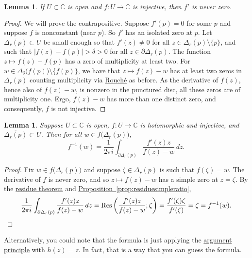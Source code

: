 \documentclass[12pt,openany]{book}
\newcommand{\sabs}[1]{\lvert {#1} \rvert}
\newcommand{\C}{{\mathbb{C}}}
\theoremstyle{plain}
\newtheorem{lemma}[thm]{Lemma}
\theoremstyle{remark}
\theoremstyle{definition}
\theoremstyle{exercise}
\theoremstyle{example}
\newcommand{\propref}[1]{\hyperref[#1]{Proposition~\ref*{#1}}}
\begin{document}
\begin{lemma} \label{lemma:dernonzero}
If $U \subset \C$ is open and $f \colon U \to \C$ is injective, then
$f'$ is never zero.
\end{lemma}

\begin{proof}
We will prove the contrapositive.
Suppose $f'(p) = 0$ for some $p$
and suppose $f$ is nonconstant (near $p$).
So $f'$ has
an isolated zero at $p$.
Let $\overline{\Delta_r(p)} \subset U$
be small enough so that $f'(z) \not= 0$ for all $z \in \Delta_r(p) \setminus \{ p \}$,
and such that $\sabs{f(z)-f(p)} > \delta > 0$ for all $z \in \partial
\Delta_r(p)$.
The function $z \mapsto f(z) - f(p)$ has a zero of multiplicity at least
two.
For $w \in \Delta_{\delta}\bigl(f(p)\bigr) \setminus \bigl\{ f(p) \bigr\}$,
we have that
$z \mapsto f(z)-w$ has at least two zeros in $\Delta_r(p)$ counting multiplicity via
\hyperref[thm:rouche2]{Rouch\'e} as
before.  As the derivative of $f(z)$, hence also of $f(z)-w$, is nonzero in
the punctured disc, all these zeros are of multiplicity one.  Ergo, $f(z)-w$
has more than one distinct zero, and consequently, $f$ is not injective.
\end{proof}

\begin{lemma} \label{lemma:inverseasintegral}
Suppose $U \subset \C$ is open,
$f \colon U \to \C$ is holomorphic and injective, and
$\overline{\Delta_r(p)} \subset U$.  Then for all $w \in
f\bigl(\Delta_r(p)\bigr)$,
\begin{equation*}
f^{-1}(w) = \frac{1}{2\pi i} \int_{\partial \Delta_r(p)}
\frac{f'(z)z}{f(z)-w} \, dz .
\end{equation*}
\end{lemma}

\begin{proof}
Fix $w \in f\bigl(\Delta_r(p)\bigr)$ and suppose $\zeta \in \Delta_r(p)$
is such that $f(\zeta) = w$.
The derivative of $f$ is never zero, and so $z \mapsto f(z)-w$ has a simple
zero at $z=\zeta$.  By the \hyperref[thm:residue]{residue theorem} and
\propref{prop:residuesimpleratio},
\begin{equation*}
\frac{1}{2\pi i} \int_{\partial \Delta_r(p)}
\frac{f'(z)z}{f(z)-w} \, dz
=
\operatorname{Res}\left(\frac{f'(z)z}{f(z)-w};\zeta\right)
=
\frac{f'(\zeta)\zeta}{f'(\zeta)} = \zeta = f^{-1}(w) .
\qedhere
\end{equation*}
\end{proof}

Alternatively, you could note that the formula is just applying the
\hyperref[thm:argprinc]{argument principle} with $h(z)=z$.
In fact, that is a way that you can guess the formula.
\end{document}
